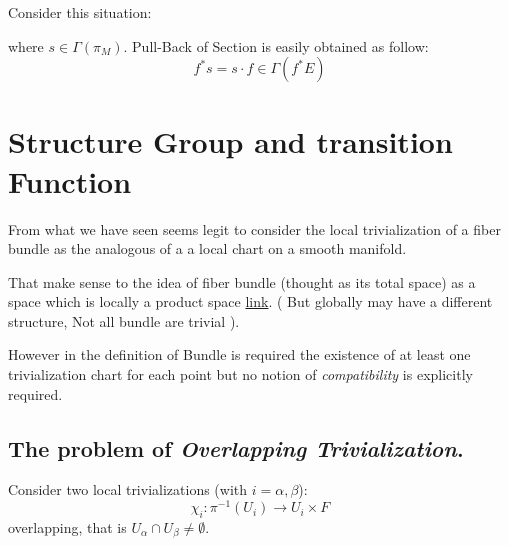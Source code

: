 \documentclass[a4paper,12pt]{scrartcl}    %
\begin{document}
\begin{observation}
Consider this situation:

where $s \in \Gamma(\pi_M)$.
Pull-Back of Section is easily obtained as follow:
\begin{displaymath}
f^* s = s \cdot f \in \Gamma(f^* E)
\end{displaymath}

\end{observation}

\newpage
\section{Structure Group and transition Function}
From what we have seen seems legit to consider the local trivialization of a fiber bundle as the analogous of a a local chart on a smooth manifold.

That make sense to the idea of fiber bundle (thought as its total space) as a space which is locally a product space
\href{http://en.wikipedia.org/wiki/Vector_bundle#mediaviewer/File:Moebiusstrip.png}{link}.
( But globally may have a different structure, Not all bundle are trivial ).

However in the definition of Bundle is required the existence of at least one trivialization chart  for each point but no notion of \emph{compatibility} is explicitly required.

\subsection{The problem of \emph{Overlapping Trivialization}.}

Consider two local trivializations (with $ i = \alpha, \beta$):
\begin{displaymath}
\chi_{i} : \pi^{-1} (U_{i}) \rightarrow U_{i} \times F
\end{displaymath}
overlapping, that is $ U_{\alpha} \cap U_{\beta} \neq \emptyset$.
\end{document}
